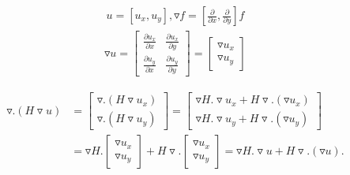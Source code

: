\documentclass[14pt]{extreport}
\begin{document}
\begin{align*}
	u = [u_x, u_y], \triangledown f = \left [\frac{\partial}{\partial x}, \frac{\partial}{\partial y}\right ] f
\end{align*}
\begin{align*}
	\triangledown u = \begin{bmatrix}\frac{\partial u_x}{\partial x} & \frac{\partial u_x}{\partial y} \\\frac{\partial u_y}{\partial x} & \frac{\partial u_y}{\partial y}\end{bmatrix}=\begin{bmatrix}\triangledown u_x\\\triangledown u_y\end{bmatrix}
\end{align*}

\begin{align*}
	\triangledown .\left ( H\triangledown u \right )&=\begin{bmatrix}\triangledown.\left(H\triangledown u_x\right)\\\triangledown.\left(H\triangledown u_y\right)\end{bmatrix}=\begin{bmatrix}\triangledown H .\triangledown u_x+H\triangledown.\left(\triangledown u_x\right)\\\triangledown H .\triangledown u_y+H\triangledown.\left(\triangledown u_y\right)\end{bmatrix}\\
	&=\triangledown H.\begin{bmatrix}\triangledown u_x\\\triangledown u_y\end{bmatrix}+H\triangledown.\begin{bmatrix}\triangledown u_x\\ \triangledown u_y\end{bmatrix}=\triangledown H.\triangledown u+H\triangledown.\left(\triangledown u\right).	
\end{align*}
\end{document}
